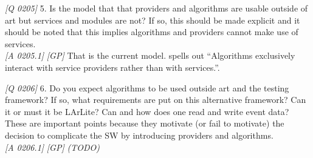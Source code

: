 \emph{{[}Q 0205{]}}
5. Is the model that that providers and algorithms are usable outside of art but services and modules are not? If so, this should be made explicit and it should be noted that this implies algorithms and providers cannot make use of services.\\
\emph{{[}A 0205.1{]}} \emph{{[}GP{]}}
That is the current model.
 spells out ``Algorithms exclusively interact with service providers rather than with \ART services.''.


\emph{{[}Q 0206{]}}
6. Do you expect algorithms to be used outside art and the testing framework? If so, what requirements are put on this alternative framework? Can it or must it be LArLite? Can and how does one read and write event data? These are important points because they motivate (or fail to motivate) the decision to complicate the SW by introducing providers and algorithms.\\
\emph{{[}A 0206.1{]}} \emph{{[}GP{]}}
\emph{(TODO)}


